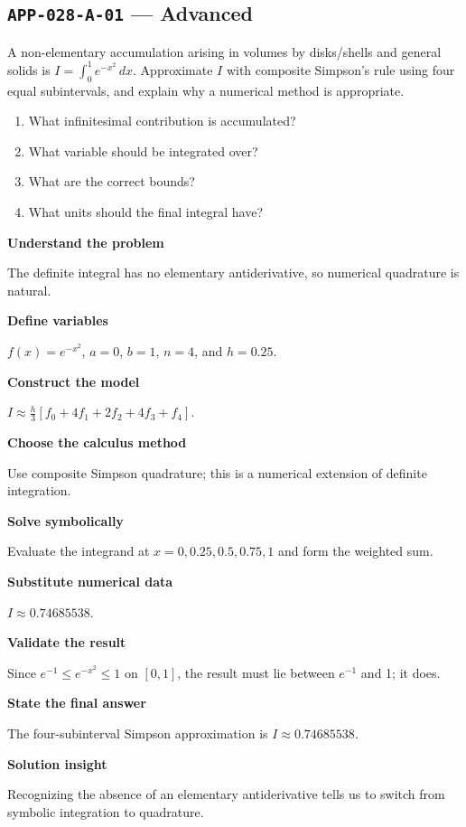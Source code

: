 \documentclass[11pt]{book}
\newcommand{\pid}[1]{\texttt{#1}}
\begin{document}
\subsection*{\pid{APP-028-A-01} — Advanced}
\begin{problembox}
A non-elementary accumulation arising in volumes by disks/shells and general solids is $I=\int_0^1 e^{-x^2}\,dx$. Approximate $I$ with composite Simpson's rule using four equal subintervals, and explain why a numerical method is appropriate.
\end{problembox}
\begin{promptbox}\begin{enumerate}
\item What infinitesimal contribution is accumulated?
\item What variable should be integrated over?
\item What are the correct bounds?
\item What units should the final integral have?
\end{enumerate}\end{promptbox}
\begin{solutionbox}
\textbf{Understand the problem}\par The definite integral has no elementary antiderivative, so numerical quadrature is natural.\par\medskip
\textbf{Define variables}\par $f(x)=e^{-x^2}$, $a=0$, $b=1$, $n=4$, and $h=0.25$.\par\medskip
\textbf{Construct the model}\par $I\approx\frac{h}{3}[f_0+4f_1+2f_2+4f_3+f_4]$.\par\medskip
\textbf{Choose the calculus method}\par Use composite Simpson quadrature; this is a numerical extension of definite integration.\par\medskip
\textbf{Solve symbolically}\par Evaluate the integrand at $x=0,0.25,0.5,0.75,1$ and form the weighted sum.\par\medskip
\textbf{Substitute numerical data}\par $I\approx 0.74685538$.\par\medskip
\textbf{Validate the result}\par Since $e^{-1}\le e^{-x^2}\le1$ on $[0,1]$, the result must lie between $e^{-1}$ and 1; it does.\par\medskip
\textbf{State the final answer}\par The four-subinterval Simpson approximation is $I\approx 0.74685538$.\par\medskip
\textbf{Solution insight}\par Recognizing the absence of an elementary antiderivative tells us to switch from symbolic integration to quadrature.\par\medskip
\end{solutionbox}
\end{document}
